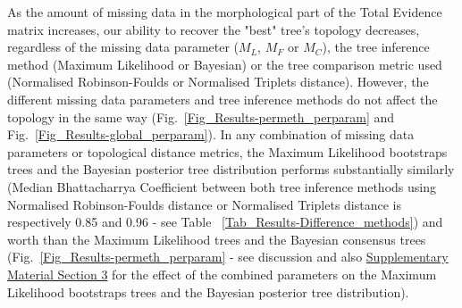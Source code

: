 \documentclass[12pt,letterpaper]{article}
\begin{document}
As the amount of missing data in the morphological part of the Total Evidence matrix increases, our ability to recover the "best" tree's topology decreases, regardless of the missing data parameter ($M_{L}$, $M_{F}$ or $M_{C}$), the tree inference method (Maximum Likelihood or Bayesian) or the tree comparison metric used (Normalised Robinson-Foulds or Normalised Triplets distance). However, the different missing data parameters and tree inference methods do not affect the topology in the same way (Fig.~\ref{Fig_Results-permeth_perparam} and Fig.~\ref{Fig_Results-global_perparam}).
In any combination of missing data parameters or topological distance metrics, the Maximum Likelihood bootstraps trees and the Bayesian posterior tree distribution performs substantially similarly (Median Bhattacharrya Coefficient between both tree inference methods using Normalised Robinson-Foulds distance or Normalised Triplets distance is respectively 0.85 and 0.96 - see Table ~\ref{Tab_Results-Difference_methods}) and worth than the Maximum Likelihood trees and the Bayesian consensus trees (Fig.~\ref{Fig_Results-permeth_perparam} - see discussion %
 and also \hyperref[SupplementaryMaterial]{Supplementary Material Section 3} for the effect of the combined parameters on the Maximum Likelihood bootstraps trees and the Bayesian posterior tree distribution).

\end{document}
